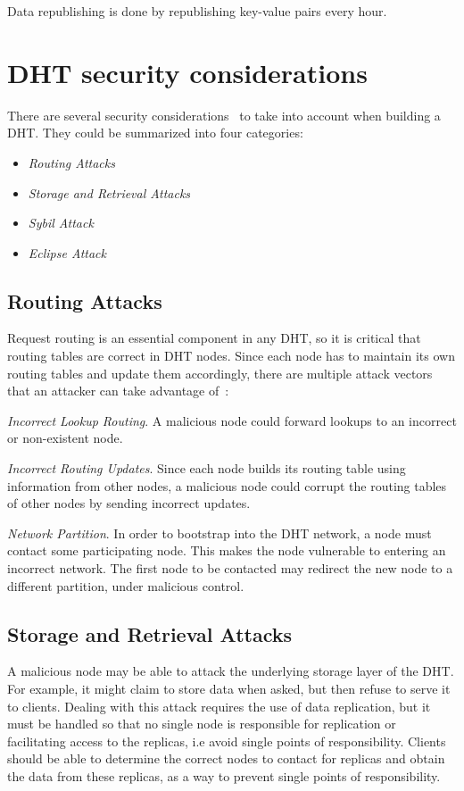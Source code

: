 Data republishing is done by republishing key-value pairs every hour.

\section{\ac{DHT} security considerations}
There are several security considerations~\cite{Urdaneta2011} to take into
account when building a \ac{DHT}. They could be summarized into four categories:
\begin{itemize}
    \item \textit{Routing Attacks}
    \item \textit{Storage and Retrieval Attacks}
    \item \textit{Sybil Attack}
    \item \textit{Eclipse Attack}
\end{itemize}

\subsection{Routing Attacks} \label{ssec:routing-attacks}
Request routing is an essential component in any \ac{DHT}, so it is critical that
routing tables are correct in \ac{DHT} nodes. Since each node has to maintain its
own routing tables and update them accordingly, there are multiple attack
vectors that an attacker can take advantage of~\cite{Castro2002}:

\textit{Incorrect Lookup Routing}. A malicious node could forward lookups to an
incorrect or non-existent node.

\textit{Incorrect Routing Updates}. Since each node builds its routing table
using information from other nodes, a malicious node could corrupt the routing
tables of other nodes by sending incorrect updates.

\textit{Network Partition}. In order to bootstrap into the \ac{DHT} network, a node must contact some participating node. This makes the node vulnerable to entering an incorrect network.
The first node to be contacted may redirect the new node to a different partition, under malicious control.

\subsection{Storage and Retrieval Attacks}

A malicious node may be able to attack the underlying storage layer of the \ac{DHT}.
For example, it might claim to store data when asked, but then refuse to
serve it to clients.
Dealing with this attack requires the use of data replication, but it must be
handled so that no single node is responsible for replication or
facilitating access to the replicas, i.e avoid single points of
responsibility.
Clients should be able to determine the correct nodes to contact for replicas and obtain the data from these replicas, as a way to prevent single points of responsibility.


